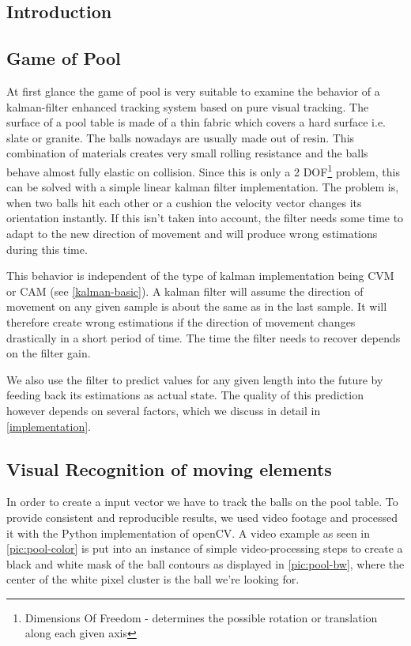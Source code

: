 \documentclass[notitlepage, a4paper, 11pt]{scrartcl}
\begin{document}
\begin{multicols}{2}
\section{Introduction}

\subsection{Game of Pool} \label{intro}

At first glance the game of pool is very suitable to examine the behavior of a kalman-filter enhanced tracking system based on pure visual tracking. 
The surface of a pool table is made of a thin fabric which covers a hard surface i.e. slate or granite.
The balls nowadays are usually made out of resin. This combination of materials creates very small rolling resistance and the balls behave almost fully elastic on collision.
Since this is only a 2 DOF\footnote{Dimensions Of Freedom - determines the possible rotation or translation along each given axis} problem, this can be solved with a simple linear kalman filter implementation. 
The problem is, when two balls hit each other or a cushion the velocity vector changes its orientation instantly. 
If this isn't taken into account, the filter needs some time to adapt to the new direction of movement and will produce wrong estimations during this time.

This behavior is independent of the type of kalman implementation being CVM or CAM (see \cref{kalman-basic}).
A kalman filter will assume the direction of movement on any given sample is about the same as in the last sample. 
It will therefore create wrong estimations if the direction of movement changes drastically in a short period of time. The time the filter needs to recover depends on the filter gain.

We also use the filter to predict values for any given length into the future by feeding back its estimations as actual state. 
The quality of this prediction however depends on several factors, which we discuss in detail in \cref{implementation}.

\subsection{Visual Recognition of moving elements}

In order to create a input vector we have to track the balls on the pool table. 
To provide consistent and reproducible results, we used video footage and processed it with the Python implementation of openCV.
A video example as seen in \cref{pic:pool-color} is put into an instance of simple video-processing steps to create a black and white mask of the ball contours as displayed in \cref{pic:pool-bw},
where the center of the white pixel cluster is the ball we're looking for.


\end{multicols}
\end{document}
